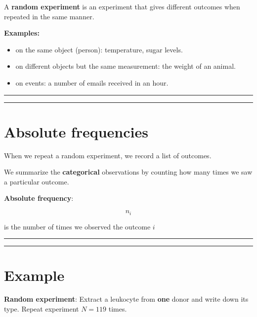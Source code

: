 \documentclass[
]{book}
\providecommand{\tightlist}{%
  \setlength{\itemsep}{0pt}\setlength{\parskip}{0pt}}
\begin{document}
A \textbf{random experiment} is an experiment that gives different outcomes when repeated in the same manner.

\textbf{Examples:}

\begin{itemize}
\tightlist
\item
  on the same object (person): temperature, sugar levels.\\
\item
  on different objects but the same measurement: the weight of an animal.
\item
  on events: a number of emails received in an hour.
\end{itemize}

\begin{center}\rule{0.5\linewidth}{0.5pt}\end{center}

\begin{center}\rule{0.5\linewidth}{0.5pt}\end{center}

\hypertarget{absolute-frequencies}{%
\section{Absolute frequencies}\label{absolute-frequencies}}

When we repeat a random experiment, we record a list of outcomes.

We summarize the \textbf{categorical} observations by counting how many times we saw a particular outcome.

\textbf{Absolute frequency}:

\[n_i\]

is the number of times we observed the outcome \(i\)

\begin{center}\rule{0.5\linewidth}{0.5pt}\end{center}

\begin{center}\rule{0.5\linewidth}{0.5pt}\end{center}

\hypertarget{example}{%
\section{Example}\label{example}}

\textbf{Random experiment}: Extract a leukocyte from \textbf{one} donor and write down its type. Repeat experiment \(N=119\) times.
\end{document}
